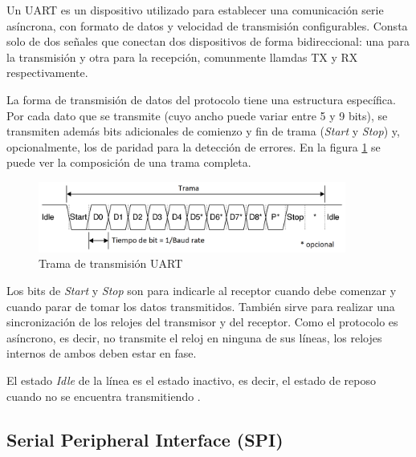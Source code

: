 Un UART es un dispositivo utilizado para establecer una comunicación serie asíncrona, con formato de datos y velocidad de transmisión configurables. Consta solo de dos señales que conectan dos dispositivos de forma bidireccional: una para la transmisión y otra para la recepción, comunmente llamdas TX y RX respectivamente.

La forma de transmisión de datos del protocolo tiene una estructura específica. Por cada dato que se transmite (cuyo ancho puede variar entre 5 y 9 bits), se transmiten además bits adicionales de comienzo y fin de trama (\textit{Start} y \textit{Stop}) y, opcionalmente, los de paridad para la detección de errores. En la figura \ref{fig:transUART} se puede ver la composición de una trama completa.

\begin{figure}[H]
\centering
\includegraphics[width=0.9\textwidth]{./Figures/UART_frame.png}
\caption{Trama de transmisión UART}
\label{fig:transUART}
\end{figure}

Los bits de \textit{Start} y \textit{Stop} son para indicarle al receptor cuando debe comenzar y cuando parar de tomar los datos transmitidos. También sirve para realizar una sincronización de los relojes del transmisor y del receptor. Como el protocolo es asíncrono, es decir, no transmite el reloj en ninguna de sus líneas, los relojes internos de ambos deben estar en fase.

El estado \textit{Idle} de la línea es el estado inactivo, es decir, el estado de reposo cuando no se encuentra transmitiendo \citep{WEBSITE:3}.

\subsection{Serial Peripheral Interface (SPI)}


